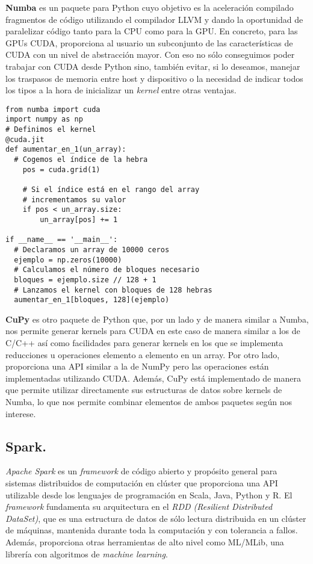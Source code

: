 \textbf{Numba} \cite{numba} es un paquete para Python cuyo objetivo es la aceleración compilado fragmentos de código utilizando el compilador LLVM y dando la oportunidad de paralelizar código tanto para la CPU como para la GPU. En concreto, para las GPUs CUDA, proporciona al usuario un subconjunto de las características de CUDA con un nivel de abstracción mayor. Con eso no sólo conseguimos poder trabajar con CUDA desde Python sino, también evitar, si lo deseamos, manejar los traspasos de memoria entre host y dispositivo o la necesidad de indicar todos los tipos a la hora de inicializar un \textit{kernel} entre otras ventajas.
\begin{code}
\begin{verbatim}
from numba import cuda
import numpy as np
# Definimos el kernel
@cuda.jit
def aumentar_en_1(un_array):
  # Cogemos el índice de la hebra
    pos = cuda.grid(1)

    # Si el índice está en el rango del array
    # incrementamos su valor
    if pos < un_array.size:
        un_array[pos] += 1

if __name__ == '__main__':
  # Declaramos un array de 10000 ceros
  ejemplo = np.zeros(10000)
  # Calculamos el número de bloques necesario
  bloques = ejemplo.size // 128 + 1
  # Lanzamos el kernel con bloques de 128 hebras
  aumentar_en_1[bloques, 128](ejemplo)
\end{verbatim}
\label{code:numbaexample}
\end{code}

\textbf{CuPy} \cite{cupy} es otro paquete de Python que, por un lado y de manera similar a Numba, nos permite generar kernels para CUDA en este caso de manera similar a los de C/C++ así como facilidades para generar kernels en los que se implementa reducciones u operaciones elemento a elemento en un array. Por otro lado, proporciona una API similar a la de NumPy pero las operaciones están implementadas utilizando CUDA. Además, CuPy está implementado de manera que permite utilizar directamente sus estructuras de datos sobre kernels de Numba, lo que nos permite combinar elementos de ambos paquetes según nos interese.

\subsection{Spark.}
\textit{Apache Spark} es un \textit{framework} de código abierto y propósito general para sistemas distribuidos de computación en clúster que proporciona una API utilizable desde los lenguajes de programación en Scala, Java, Python y R. El \textit{framework} fundamenta su arquitectura en el \textit{RDD (Resilient Distributed DataSet)}, que es una estructura de datos de sólo lectura distribuida en un clúster de máquinas, mantenida durante toda la computación y con tolerancia a fallos. Además, proporciona otras herramientas de alto nivel como ML/MLib, una librería con algoritmos de \textit{machine learning}.\\

